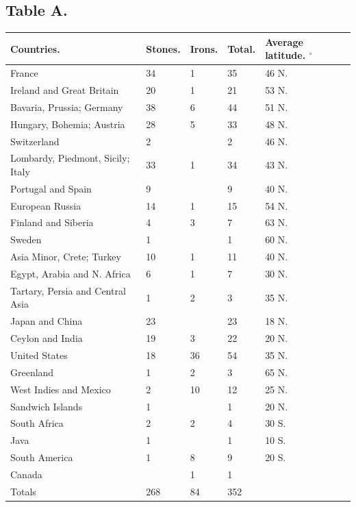 \documentclass[a4paper, 12pt, oneside]{article}
\begin{document}
\subsection{Table A.}
\begin{table}[H]
    \centering
    \bfseries
    \Fontauri
    \footnotesize
    \begin{tabular}{|p{40mm}|l|l|l|p{17mm}|}
    \hline
         Countries. & Stones. & Irons. & Total. & Average latitude. $^\circ$ \\ \hline
        France & 34 & 1 & 35 & 46 N. \\ \hline
        Ireland and Great Britain & 20 & 1 & 21 & 53 N. \\ \hline
        Bavaria, Prussia; Germany & 38 & 6 & 44 & 51 N. \\ \hline
        Hungary, Bohemia; Austria & 28 & 5 & 33 & 48 N. \\ \hline
        Switzerland & 2 & ~ & 2 & 46 N. \\ \hline
        Lombardy, Piedmont, Sicily; Italy & 33 & 1 & 34 & 43 N. \\ \hline
        Portugal and Spain & 9 & ~ & 9 & 40 N. \\ \hline
        European Russia & 14 & 1 & 15 & 54 N. \\ \hline
        Finland and Siberia & 4 & 3 & 7 & 63 N. \\ \hline
        Sweden & 1 & ~ & 1 & 60 N. \\ \hline
        Asia Minor, Crete; Turkey & 10 & 1 & 11 & 40 N. \\ \hline
        Egypt, Arabia and N. Africa & 6 & 1 & 7 & 30 N. \\ \hline
        Tartary, Persia and Central Asia & 1 & 2 & 3 & 35 N. \\ \hline
        Japan and China & 23 & ~ & 23 & 18 N. \\ \hline
        Ceylon and India & 19 & 3 & 22 & 20 N. \\ \hline
        United States & 18 & 36 & 54 & 35 N. \\ \hline
        Greenland & 1 & 2 & 3 & 65 N. \\ \hline
        West Indies and Mexico & 2 & 10 & 12 & 25 N. \\ \hline
        Sandwich Islands & 1 & ~ & 1 & 20 N. \\ \hline
        South Africa & 2 & 2 & 4 & 30 S. \\ \hline
        Java & 1 & ~ & 1 & 10 S. \\ \hline
        South America & 1 & 8 & 9 & 20 S. \\ \hline
        Canada & ~ & 1 & 1 & ~ \\ \hline \hline
        Totals & 268 & 84 & 352 & ~ \\ \hline
    \end{tabular}
\end{table}
\end{document}
